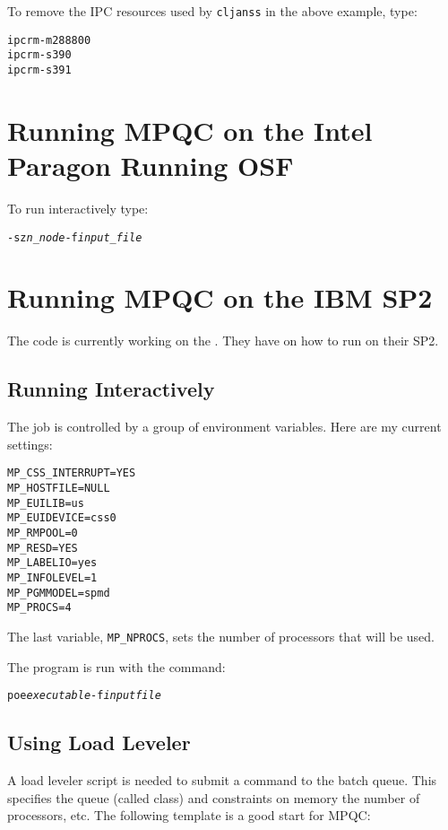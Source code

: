To remove the IPC resources used by \verb|cljanss| in
the above example, type:

\begin{alltt}
ipcrm -m 288800
ipcrm -s 390
ipcrm -s 391
\end{alltt}

\section{Running MPQC on the Intel Paragon Running OSF}

To run interactively type:
\begin{alltt}
 -sz {\itshape n_node} -f {\itshape input_file}
\end{alltt}

\section{Running MPQC on the IBM SP2}

The code is currently working on the
.
They have 
on how to run on their SP2.

\subsection{Running Interactively}

The job is controlled by a group of environment variables.
Here are my current settings:
\begin{verbatim}
MP_CSS_INTERRUPT=YES
MP_HOSTFILE=NULL
MP_EUILIB=us
MP_EUIDEVICE=css0
MP_RMPOOL=0
MP_RESD=YES
MP_LABELIO=yes
MP_INFOLEVEL=1
MP_PGMMODEL=spmd
MP_PROCS=4
\end{verbatim}
The last variable, \verb|MP_NPROCS|, sets the number
of processors that will be used.

The program is run with the command:
\begin{alltt}
poe {\itshape executable} -f {\itshape inputfile}
\end{alltt}

\subsection{Using Load Leveler}

A load leveler script is needed to submit a command to the batch queue.
This specifies the queue (called class) and constraints on memory the
number of processors, etc.  The following template is a good start for
MPQC:

